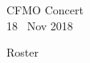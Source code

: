 \documentclass[letter,6pt,poets]{ConcProg}
\begin{document}
\begin{programme}{
    CFMO Concert
\\  {\normalsize 18 ~Nov 2018}
}
\begin{part}[]

%

  \end{part}
  
  
\end{programme}
\begin{center}
Roster
\end{center}
\end{document}
